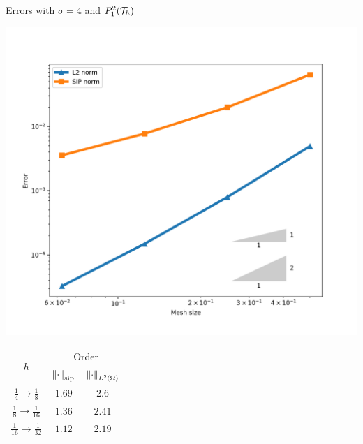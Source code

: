 		\begin{frame}{Errors with $\sigma=4$ and $\relax{P}^2_1(\mathcal{T}_h)$}
		\begin{minipage}{0.50\textwidth}
			\centering
			\includegraphics[scale=0.30]{img/Difusion/errores_difusion_P1dc.png}
		\end{minipage}
		\begin{minipage}{0.49\textwidth}
			\centering
			\begin{tabular}{|c|c|c|}
				\hline 
				\multirow{2}{*}{$h$} & \multicolumn{2}{c|}{Order} \\
				\cline{2-3}
				&  $\left\|\cdot\right\|_{\text{sip}}$ & $\left\|\cdot\right\|_{L^2(\Omega)}$ \\ 
				\hline
				\hline
				$\frac{1}{4}\to\frac{1}{8}$ & $1.69$ & $2.6$ \\ 
				\hline 
				$\frac{1}{8}\to\frac{1}{16}$ & $1.36$ & $2.41$ \\ 
				\hline 
				$\frac{1}{16}\to\frac{1}{32}$ & $1.12$ & $2.19$\\
				\hline
			\end{tabular}
		\end{minipage}
		\end{frame}
		
